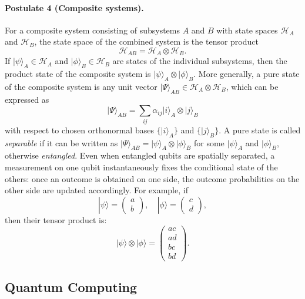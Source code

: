 \documentclass[12pt,a4paper,openany]{report}
\begin{document}
\paragraph{Postulate 4 (Composite systems).}
For a composite system consisting of subsystems $A$ and $B$ with state spaces $\mathcal{H}_A$ and $\mathcal{H}_B$, the state space of the combined system is the tensor product
\begin{equation}
  \mathcal{H}_{AB} = \mathcal{H}_A \otimes \mathcal{H}_B.
\end{equation}
If $\lvert \psi \rangle_A \in \mathcal{H}_A$ and $\lvert \phi \rangle_B \in \mathcal{H}_B$ are states of the individual subsystems, then the product state of the composite system is $\lvert \psi \rangle_A \otimes \lvert \phi \rangle_B$. More generally, a pure state of the composite system is any unit vector $\lvert \Psi \rangle_{AB} \in \mathcal{H}_A \otimes \mathcal{H}_B$, which can be expressed as
\begin{equation}
  \lvert \Psi \rangle_{AB} = \sum_{ij} \alpha_{ij} \lvert i \rangle_A \otimes \lvert j \rangle_B
\end{equation}
with respect to chosen orthonormal bases $\{\lvert i \rangle_A\}$ and $\{\lvert j \rangle_B\}$.
A pure state is called \emph{separable} if it can be written as $\lvert \Psi \rangle_{AB} = \lvert \psi \rangle_A \otimes \lvert \phi \rangle_B$ for some $\lvert \psi \rangle_A$ and $\lvert \phi \rangle_B$, otherwise \emph{entangled}.
Even when entangled qubits are spatially separated, a measurement on one qubit instantaneously fixes the conditional state of the others: once an outcome is obtained on one side, the outcome probabilities on the other side are updated accordingly.
For example, if
\[
|\psi\rangle = \begin{pmatrix} a \\ b \end{pmatrix}, \quad |\phi\rangle = \begin{pmatrix} c \\ d \end{pmatrix},
\]
then their tensor product is:
\[
|\psi\rangle \otimes |\phi\rangle = \begin{pmatrix} a c \\ a d \\ b c \\ b d \end{pmatrix}.
\]

\subsection{Quantum Computing}
\end{document}
